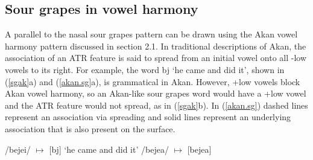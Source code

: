 \documentclass[,doc,floatsintext]{apa6}
\theoremstyle{definition}
\theoremstyle{definition}
\theoremstyle{definition}
\theoremstyle{remark}
\begin{document}
\subsection{Sour grapes in vowel
harmony}\label{sour-grapes-in-vowel-harmony}

A parallel to the nasal sour grapes pattern can be drawn using the Akan
vowel harmony pattern discussed in section 2.1. In traditional
descriptions of Akan, the association of an ATR feature is said to
spread from an initial vowel onto all -low vowels to its right. For
example, the word bj `he
came and did it', shown in (\ref{sgak}a) and (\ref{akan.sg}a), is
grammatical in Akan. However, +low vowels block Akan vowel harmony, so
an Akan-like sour grapes word would have a +low vowel and the ATR
feature would not spread, as in (\ref{sgak}b). In (\ref{akan.sg}) dashed
lines represent an association via spreading and solid lines represent
an underlying association that is also present on the surface.

\begin{exe}
\label{sgak} 
\begin{xlist}
  \ex /bejei/ $\mapsto$ [bj] `he came and did it'
  \ex /bejea/ $\mapsto$ [bejea]
\end{xlist}
\end{exe}

\newpage
\end{document}
